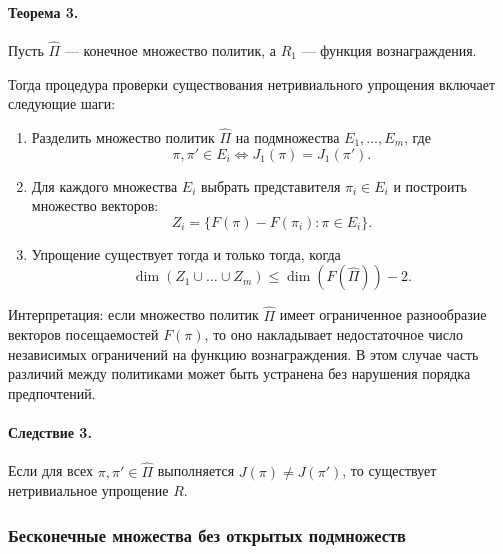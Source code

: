 \begin{theorem}
\label{th:simplification_check}
\paragraph{Теорема 3.} Пусть $\widehat{\Pi}$ — конечное множество политик, а $R_1$ — функция вознаграждения.  

Тогда процедура проверки существования нетривиального упрощения включает следующие шаги:

\begin{enumerate}
    \item Разделить множество политик $\widehat{\Pi}$ на подмножества $E_1, \dots, E_m$, где
    \begin{equation}
    \pi, \pi' \in E_i \iff J_1(\pi) = J_1(\pi').
    \end{equation}
    \item Для каждого множества $E_i$ выбрать представителя $\pi_i \in E_i$ и построить множество векторов:
    \begin{equation}
    Z_i = \{ F(\pi) - F(\pi_i) : \pi \in E_i \}.
    \end{equation}
    \item Упрощение существует тогда и только тогда, когда
    \begin{equation}
    \dim(Z_1 \cup \dots \cup Z_m) \le \dim(F(\widehat{\Pi})) - 2.
    \end{equation}
\end{enumerate}

\end{theorem}

Интерпретация: если множество политик $\widehat{\Pi}$ имеет ограниченное разнообразие векторов посещаемостей $F(\pi)$, то оно накладывает недостаточное число независимых ограничений на функцию вознаграждения. В этом случае часть различий между политиками может быть устранена без нарушения порядка предпочтений.


\begin{corollary}
\label{cor:simplification_exists}
\paragraph{Следствие 3.} Если для всех $\pi, \pi' \in \widehat{\Pi}$ выполняется $J(\pi) \ne J(\pi')$,  
то существует нетривиальное упрощение $R$.
\end{corollary}

\subsubsection{Бесконечные множества без открытых подмножеств}

